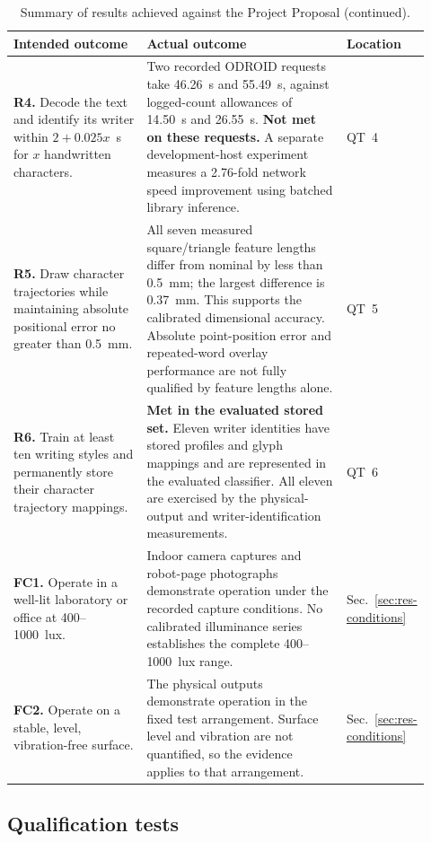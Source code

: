\begin{table}[!htbp]\ContinuedFloat\centering\small
\setlength{\tabcolsep}{5pt}
\begin{tabular}{p{0.32\linewidth}p{0.48\linewidth}p{0.12\linewidth}}\toprule
\textbf{Intended outcome} & \textbf{Actual outcome} & \textbf{Location}\\\midrule
\textbf{R4.} Decode the text and identify its writer within $2+0.025x$~s for $x$ handwritten characters. & Two recorded ODROID requests take 46.26~s and 55.49~s, against logged-count allowances of 14.50~s and 26.55~s. \textbf{Not met on these requests.} A separate development-host experiment measures a 2.76-fold network speed improvement using batched library inference. & QT~4\\[5pt]
\textbf{R5.} Draw character trajectories while maintaining absolute positional error no greater than 0.5~mm. & All seven measured square/triangle feature lengths differ from nominal by less than 0.5~mm; the largest difference is 0.37~mm. This supports the calibrated dimensional accuracy. Absolute point-position error and repeated-word overlay performance are not fully qualified by feature lengths alone. & QT~5\\[5pt]
\textbf{R6.} Train at least ten writing styles and permanently store their character trajectory mappings. & \textbf{Met in the evaluated stored set.} Eleven writer identities have stored profiles and glyph mappings and are represented in the evaluated classifier. All eleven are exercised by the physical-output and writer-identification measurements. & QT~6\\[5pt]
\textbf{FC1.} Operate in a well-lit laboratory or office at 400--1000~lux. & Indoor camera captures and robot-page photographs demonstrate operation under the recorded capture conditions. No calibrated illuminance series establishes the complete 400--1000~lux range. & Sec.~\ref{sec:res-conditions}\\[5pt]
\textbf{FC2.} Operate on a stable, level, vibration-free surface. & The physical outputs demonstrate operation in the fixed test arrangement. Surface level and vibration are not quantified, so the evidence applies to that arrangement. & Sec.~\ref{sec:res-conditions}\\
\bottomrule\end{tabular}
\caption{Summary of results achieved against the Project Proposal (continued).}
\end{table}
\FloatBarrier


\subsection{Qualification tests}
\label{sec:res-qtp}
